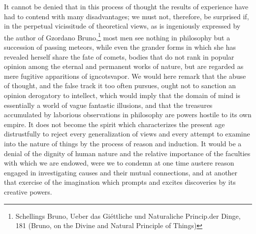 It cannot be denied that in this process of thought the results of experience have had to contend with many disadvantages; we must not, therefore, be surprised if, in the perpetual vicissitude of theoretical views, as is ingeniously expressed by the author of Gzordano Bruno,\footnote{Schellings Bruno, Ueber das Gi\'{e}ttliche und Naturaliche Princip.der Dinge,  181 (Bruno, on the Divine and Natural Principle of Things)} most men see nothing in philosophy but a succession of passing meteors, while even the grander forms in which she has revealed herself share the fate of comets, bodies that do not rank in popular opinion among the eternal and permanent works of nature, but are regarded as mere fugitive apparitions of igncotsvapor. We would here remark that the abuse of thought, and the false track it too often pursues, ought not to sanction an opinion derogatory to intellect, which would imply that the domain of mind is essentially a world of vague fantastic illusions, and that the treasures accumulated by laborious observations in philosophy are powers hostile to its own empire. It does not become the spirit which characterizes the present age distrustfully to reject every generalization of views and every attempt to examine into the nature of things by the process of reason and induction. It would be a denial of the dignity of human nature and the relative importance of the faculties with which we are endowed, were we to condemn at one time austere reason engaged in investigating causes and their mutual connections, and at another that exercise of the imagination which prompts and excites discoveries by its creative powers. 
